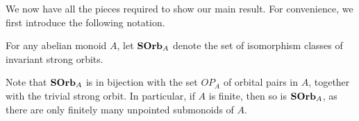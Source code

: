 \documentclass[11pt]{amsart}
\begin{document}




We now have all the pieces required to show our main result. For convenience, we first introduce the following notation.

\begin{notation}
    For any abelian monoid $A$, let $\mathbf{SOrb}_A$ denote the set of isomorphism classes of invariant strong orbits. 
\end{notation}

\begin{remark}\label{another.silly.rmk}
    Note that  $\mathbf{SOrb}_A$ is in bijection with the set $OP_A$ of orbital pairs in $A$,%
    together with the trivial strong orbit. In particular, if $A$ is finite, then so is $\mathbf{SOrb}_A$, as there are only finitely many unpointed submonoids of $A$.
\end{remark}
\end{document}

